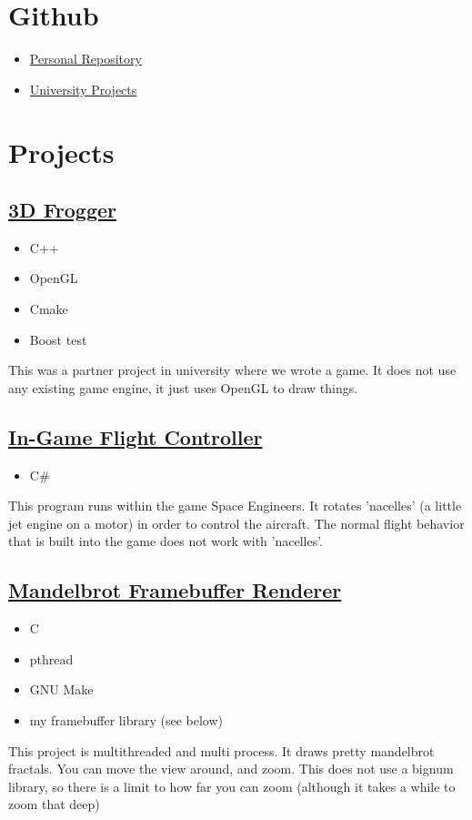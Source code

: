 \documentclass{amsart}
\theoremstyle{definition} %
\begin{document}
\pagebreak
\section{Github}
\begin{itemize}
	\item \href{https://github.com/1wsx10/}{Personal Repository}
	\item \href{https://github.com/s3543536/}{University Projects}
\end{itemize}
\section{Projects}

\subsection{\href{https://github.com/Hazelfire/I3DAssignment2}{3D Frogger}}
\begin{itemize}
	\item C++
	\item OpenGL
	\item Cmake
	\item Boost test
\end{itemize}
This was a partner project in university where we wrote a game.
It does not use any existing game engine, it just uses OpenGL to draw
things.

\subsection{\href{https://github.com/1wsx10/VectorThrust2}{In-Game Flight Controller}}
\begin{itemize}
	\item C\#
\end{itemize}
This program runs within the game Space Engineers. It rotates
'nacelles' (a little jet engine on a motor) in order to control the
aircraft. The normal flight behavior that is built into the game does
not work with 'nacelles'.

\subsection{\href{https://github.com/1wsx10/mandelbrot}{Mandelbrot Framebuffer Renderer}}
\begin{itemize}
	\item C
	\item pthread
	\item GNU Make
	\item my framebuffer library (see below)
\end{itemize}
This project is multithreaded and multi process. It draws pretty
mandelbrot fractals. You can move the view around, and zoom.
This does not use a bignum library, so there is a limit to how far
you can zoom (although it takes a while to zoom that deep)
\end{document}
